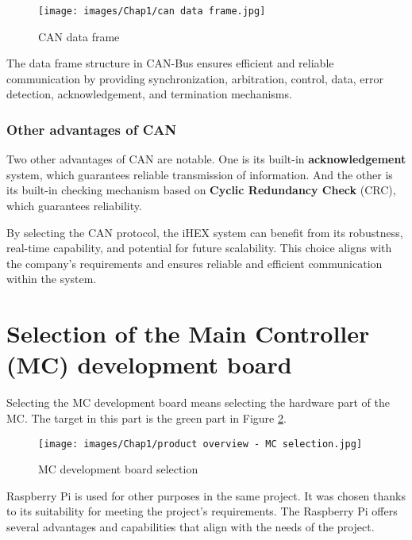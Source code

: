 \begin{figure}[H]
\begin{center}
\texttt{[image: images/Chap1/can data frame.jpg]}\\
\caption{CAN data frame}
\label{can data frame}
\end{center}
\end{figure}

The data frame structure in CAN-Bus ensures efficient and reliable communication by providing synchronization, arbitration, control, data, error detection, acknowledgement, and termination mechanisms.

\subsubsection{Other advantages of CAN}

Two other advantages of CAN are notable. One is its built-in \textbf{acknowledgement} system, which guarantees reliable transmission of information. And the other is its built-in checking mechanism based on \textbf{Cyclic Redundancy Check} (CRC), which guarantees reliability. \cite{R12}

By selecting the CAN protocol, the iHEX system can benefit from its robustness, real-time capability, and potential for future scalability. This choice aligns with the company's requirements and ensures reliable and efficient communication within the system.

\section{Selection of the Main Controller (MC) development board}
Selecting the MC development board means selecting the hardware part of the MC. The target in this part is the green part in Figure \ref{MC selection}.

\begin{figure}[H]
\begin{center}
\texttt{[image: images/Chap1/product overview - MC selection.jpg]}\\
\caption{MC development board selection}
\label{MC selection}
\end{center}
\end{figure} 

Raspberry Pi is used for other purposes in the same project. It was chosen thanks to its suitability for meeting the project's requirements. The Raspberry Pi offers several advantages and capabilities that align with the needs of the project.

